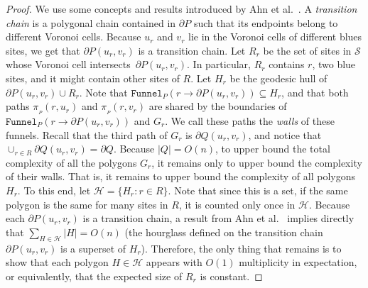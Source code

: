 \documentclass[a4paper,UKenglish]{socg-lipics-v2018}
\newcommand{\s}{\mathcal S}
\newcommand{\p}[3][P]{\ensuremath{\pi_{_{#1}}(#2, #3)}}
\newcommand{\funnel}[2][P]{\ensuremath{\mathtt{Funnel}_{\scriptscriptstyle #1}(#2)}}
\begin{document}
\begin{proof}
We use some concepts and results introduced by Ahn et al.~\cite[Section 3]{ahn2015linear}.
A \emph{transition chain} is a polygonal chain contained in $\partial P$ such that its endpoints belong to different Voronoi cells. 
Because  $u_r$ and $v_r$ lie in the Voronoi cells of different blues sites, 
we get that $\partial P(u_r, v_r)$ is a transition chain. 
Let $R_r$ be the set of sites in $\s$ whose Voronoi cell intersects~$\partial P(u_r, v_r)$. 
In particular, $R_r$ contains $r$, two blue sites, and it might contain other sites of $R$.
Let $H_r$ be the geodesic hull of $\partial P(u_r, v_r) \cup R_r$. 
Note that $\funnel{r\to \partial P(u_r, v_r)} \subseteq H_r$, and that both paths $\p{r}{u_r}$ and $\p{r}{v_r}$ are shared by the boundaries of $\funnel{r\to \partial P(u_r, v_r)}$ and $G_r$.
We call these paths the \emph{walls} of these funnels. 
Recall that the third path of $G_r$ is $\partial Q(u_r, v_r)$, and notice that $\cup_{r\in R} \partial Q(u_r, v_r) = \partial Q$. 
Because $|Q| = O(n)$, to upper bound the total complexity of all the polygons $G_r$, 
it remains only to upper bound the complexity of their walls. 
That is, it remains to upper bound the complexity of all polygons $H_r$. 
To this end, let $\mathcal H = \{H_r : r\in R\}$. Note that since this is a set, if the same polygon is the same for many sites in $R$, it is counted only once in $\mathcal H$.
Because each $\partial P(u_r, v_r)$ is a transition chain, a result from Ahn et al.~\cite[Lemma 3.6]{ahn2015linear} implies directly that $\sum_{H\in \mathcal H} |H| = O(n)$ (the hourglass defined on the transition chain $\partial P(u_r, v_r)$ is a superset of $H_r$). 
Therefore, the only thing that remains is to show that each polygon $H\in \mathcal H$ appears with $O(1)$ multiplicity in expectation, or equivalently, that the expected size of $R_r$ is constant. 



\end{proof}
\end{document}
